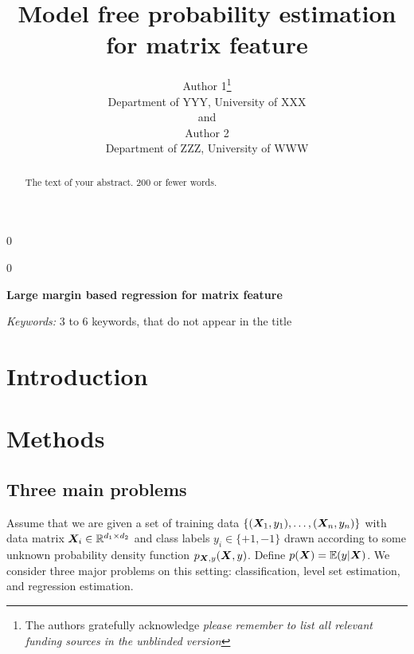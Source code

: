 \documentclass[12pt]{article}
\newcommand{\blind}{0}
\begin{document}
\setcounter{secnumdepth}{3}
%

\def\spacingset#1{\renewcommand{\baselinestretch}%
{#1}\small\normalsize} \spacingset{1}



\blind
{
  \title{\bf Model free probability estimation for matrix feature}
  \author{Author 1\thanks{
    The authors gratefully acknowledge \textit{please remember to list all relevant funding sources in the unblinded version}}\hspace{.2cm}\\
    Department of YYY, University of XXX\\
    and \\
    Author 2 \\
    Department of ZZZ, University of WWW}
  \maketitle
} \fi

\blind
{
  \bigskip
  \bigskip
  \bigskip
  \begin{center}
    {\LARGE\bf Large margin based regression for matrix feature}
\end{center}
  \medskip
} \fi

\bigskip
\begin{abstract}
The text of your abstract. 200 or fewer words.
\end{abstract}

\noindent%
{\it Keywords:}  3 to 6 keywords, that do not appear in the title
\vfill

\newpage
\spacingset{1.5} %
\section{Introduction}
\label{sec:intro}

\section{Methods}
\label{sec:meth}
\setcounter{subsection}{-1}
\subsection{Three main problems}
Assume that we are given a set of training data $\{(\bm X_1,y_1),\ldots,(\bm X_n,y_n)\}$ with data matrix $\bm X_i\in\mathbb{R}^{d_1\times d_2}$ and class labels $y_i\in\{+1,-1\}$ drawn according to some unknown probability density function $p_{\bm X,y}(\bm X,y)$. Define $p(\bm X) = \mathbb{E}(y|\bm X)$. 
We consider three major problems on this setting: classification, level set estimation, and regression estimation.
\end{document}
